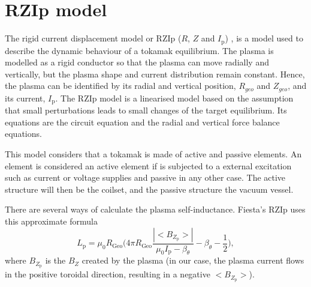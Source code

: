 \documentclass[a4paper,12pt,oneside]{book}
\begin{document}
 
 
 
 
\section{RZIp model}
\label{RZIP, teoria}


The rigid current displacement model or RZIp ($R$, $Z$ and $I_\text{p}$) \cite{AtiSharmaTesis,Lister_RZIp}, is a model used to describe the dynamic behaviour of a tokamak equilibrium. The plasma is modelled as a rigid conductor so that the plasma can move radially and vertically, but the plasma shape and current distribution remain constant. Hence, the plasma can be identified by its radial and vertical position, $R_{geo}$ and $Z_{geo}$, and its current, $I_\text{p}$. The RZIp model is a linearised model based on the assumption that small perturbations leads to small changes of the target equilibrium. Its equations are the circuit equation and the radial and vertical force balance equations.  %

This model considers that a tokamak is made of active and passive elements. An element is considered an active element if is subjected to a external excitation such as current or voltage supplies and passive in any other case. The active structure will then be the coilset, and the passive structure the vacuum vessel. 

There are several ways of calculate the plasma self-inductance.  Fiesta's RZIp uses this approximate formula \cite{Lister_RZIp}
%
\begin{equation}
L_\text{p}=\mu_0 R_\text{Geo} \Big( 4 \pi R_\text{Geo} \dfrac{|<B_{Z_\text{p}}>|}{\mu_0 I_\text{p}-\beta_\theta}-\beta_\theta -\dfrac{1}{2} \Big),
\end{equation}
where $B_{Z_\text{p}}$ is the $B_Z$ created by the plasma (in our case, the plasma current flows in the positive toroidal direction, resulting in a negative $<B_{Z_\text{p}}>$).
\end{document}
